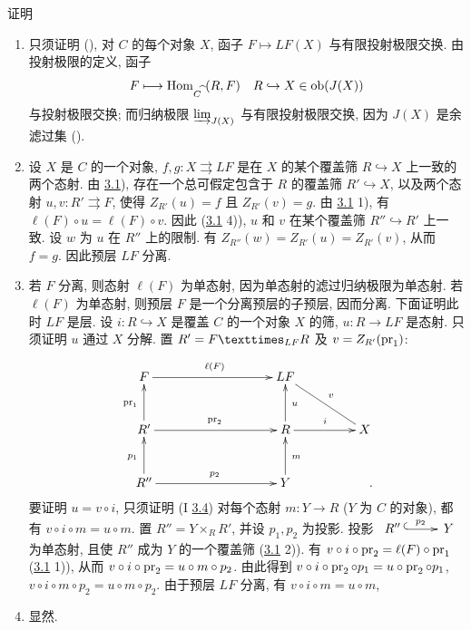 \begin{enonce*}[remark]{证明}
\begin{enumerate}
\renewcommand{\labelenumi}{\theenumi)}
\item 只须证明 (),
对 $C$ 的每个对象 $X$, 函子 $F\mapsto LF(X)$ 与有限投射极限交换.
由投射极限的定义, 函子
$$
F\longmapsto \operatorname{Hom}_{C^{\widehat{\phantom{,}}}}(R,F)\quad
R\hookrightarrow X\in \operatorname{ob}(J(X))
$$
与\pageoriginale{}投射极限交换;
而归纳极限 $\varinjlim_{J(X)}$ 与有限投射极限交换,
因为 $J(X)$ 是余滤过集 ().

\item 设 $X$ 是 $C$ 的一个对象,
$f,g:X\rightrightarrows LF$ 是在 $X$ 的某个覆盖筛
$R\hookrightarrow X$ 上一致的两个态射.
由 \hyperref[II.lem3.1]{3.1}),
存在一个总可假定包含于 $R$ 的覆盖筛 $R'\hookrightarrow X$,
以及两个态射 $u,v:R'\rightrightarrows F$,
使得 $Z_{R'}(u)=f$ 且 $Z_{R'}(v)=g$.
由 \hyperref[II.lem3.1]{3.1} 1), 有
$\ell(F)\circ u=\ell(F)\circ v$.
因此 (\hyperref[II.lem3.1]{3.1} 4)),
$u$ 和 $v$ 在某个覆盖筛 $R''\hookrightarrow R'$ 上一致.
设 $w$ 为 $u$ 在 $R''$ 上的限制.
有 $Z_{R''}(w)=Z_{R'}(u)=Z_{R'}(v)$,
从而 $f=g$. 因此预层 $LF$ 分离.

\item 若 $F$ 分离, 则态射 $\ell(F)$ 为单态射,
因为单态射的滤过归纳极限为单态射.
若 $\ell(F)$ 为单态射, 则预层 $F$ 是一个分离预层的子预层,
因而分离. 下面证明此时 $LF$ 是层.
设 $i:R\hookrightarrow X$ 是覆盖 $C$ 的一个对象 $X$ 的筛,
$u:R\rightarrow LF$ 是态射. 只须证明 $u$ 通过 $X$ 分解.
置 $R'=\fprod{F}{R}{LF}$ 及 $v=Z_{R'}(\operatorname{pr}_1)$:
\[
\xymatrix@L=5pt@R=1cm@C=1.5cm{
F \ar[rr]^{\ell(F)}               && LF                      &\\
R' \ar[u]^{\pr_1} \ar[rr]^{\pr_2}   && R \ar[r]^{i} \ar[u]_{u} & X \ar@{-}[lu]_{v}\\
R''\ar[u]^{p_1} \ar[rr]^{p_2}     && Y  \ar[u]_{m}               &
\quad . }
\]
要\pageoriginale{}证明 $u=v\circ i$,
只须证明 (I \hyperref[I.prop3.4]{3.4})
对每个态射 $m:Y\rightarrow R$ ($Y$ 为 $C$ 的对象),
都有 $v\circ i\circ m=u\circ m$.
置 $R''=Y\times_RR'$, 并设 $p_1,p_2$ 为投影.
投影 $\xymatrix@M=5pt{R''\ar@{^{(}->}[r]^{p_2}&Y}$ 为单态射,
且使 $R''$ 成为 $Y$ 的一个覆盖筛 (\hyperref[II.lem3.1]{3.1} 2)).
有 $v\circ i\circ\operatorname{pr}_2=\ell(F)\circ\operatorname{pr}_1$
(\hyperref[II.lem3.1]{3.1} 1)),
从而 $v\circ i\circ\operatorname{pr}_2=u\circ m\circ p_2$.
由此得到 $v\circ i\circ\operatorname{pr}_2\circ p_1=u\circ\operatorname{pr}_2\circ p_1$,
\ie $v\circ i\circ m\circ p_2=u\circ m\circ p_2$.
由于预层 $LF$ 分离, 有 $v\circ i\circ m=u\circ m$, \cqfd

\item 显然.
\end{enumerate}
\end{enonce*}

